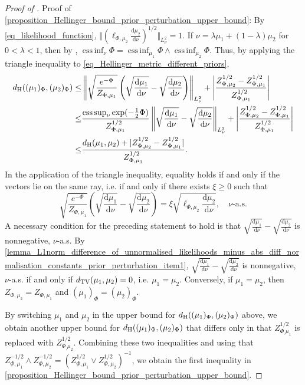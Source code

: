 \documentclass[a4paper]{scrartcl}
\theoremstyle{definition}
\numberwithin{equation}{section}
\newcommand{\rd}{\mathrm{d}}
\DeclareMathOperator*{\essinf}{ess\,inf}
\DeclareMathOperator*{\esssup}{ess\,sup}
\newcommand{\abs}[1]{\vert #1\vert}
\newcommand{\Abs}[1]{\left\vert#1\right\vert}
\newcommand{\norm}[1]{\Vert #1 \Vert}
\newcommand{\Norm}[1]{\left\Vert #1 \right\Vert}
\newcommand{\Hel}[0]{\textup{H}}
\newcommand{\TV}[0]{\textup{TV}}
\begin{document}
\begin{proof}[Proof of ]
Proof of \cref{proposition_Hellinger_bound_prior_perturbation_upper_bound}: By \eqref{eq_likelihood_function}, $\norm{ (\ell_{\Phi,\mu_2}\tfrac{\rd\mu_2}{\rd\nu})^{1/2}}_{L^2_\nu}=1$.
If $\nu=\lambda \mu_1+(1-\lambda)\mu_2$ for $0<\lambda<1$, then by , $\essinf_\nu \Phi=\essinf_{\mu_1}\Phi \wedge \essinf_{\mu_2}\Phi$.
Thus, by applying the triangle inequality to \eqref{eq_Hellinger_metric_different_priors}, 
\begin{align*}
 d_{\Hel}((\mu_1)_\Phi,(\mu_2)_\Phi)\leq & \Norm{\sqrt{\frac{e^{-\Phi}}{Z_{\Phi,\mu_1}}}\left(\sqrt{\frac{\rd\mu_1}{\rd\nu}}-\sqrt{\frac{\rd\mu_2}{\rd\nu}}\right)}_{L^2_\nu}+\Abs{\frac{Z_{\Phi,\mu_2}^{1/2}-Z_{\Phi,\mu_1}^{1/2}}{Z_{\Phi,\mu_1}^{1/2} }}
 \\
 \leq & \frac{\esssup_\nu \exp(-\tfrac{1}{2}\Phi)}{Z_{\Phi,\mu_1}^{1/2}}\Norm{\sqrt{\frac{\rd\mu_1}{\rd\nu}}-\sqrt{\frac{\rd\mu_2}{\rd\nu}}}_{L^2_\nu}+\Abs{\frac{Z_{\Phi,\mu_2}^{1/2}-Z_{\Phi,\mu_1}^{1/2}}{Z_{\Phi,\mu_1}^{1/2} }}
 \\
 \leq & \frac{d_{\Hel}(\mu_1,\mu_2)+\abs{Z_{\Phi,\mu_2}^{1/2}-Z_{\Phi,\mu_1}^{1/2}}}{Z_{\Phi,\mu_1}^{1/2}}.
\end{align*}
In the application of the triangle inequality, equality holds if and only if the vectors lie on the same ray, i.e. if and only if there exists $\xi\geq 0$ such that 
\begin{equation*}
 \sqrt{\frac{e^{-\Phi}}{Z_{\Phi,\mu_1}}}\left(\sqrt{\frac{\rd\mu_1}{\rd\nu}}-\sqrt{\frac{\rd\mu_2}{\rd\nu}}\right)=\xi \sqrt{\ell_{\Phi,\mu_2}\frac{\rd\mu_2}{\rd\nu}},\quad \text{$\nu$-a.s.}
\end{equation*}
A necessary condition for the preceding statement to hold is that $\sqrt{\tfrac{\rd\mu_1}{\rd\nu}}-\sqrt{\tfrac{\rd\mu_2}{\rd\nu}}$ is nonnegative, $\nu$-a.s.
By \ref{lemma_L1norm_difference_of_unnormalised_likelihoods_minus_abs_diff_normalisation_constants_prior_perturbation_item1}, $\sqrt{\tfrac{\rd\mu_1}{\rd\nu}}-\sqrt{\tfrac{\rd\mu_2}{\rd\nu}}$ is nonnegative, $\nu$-a.s. if and only if $d_{\TV}(\mu_1,\mu_2)=0$, i.e. $\mu_1=\mu_2$.
Conversely, if $\mu_1=\mu_2$, then $Z_{\Phi,\mu_2}=Z_{\Phi,\mu_1}$ and $(\mu_1)_\Phi=(\mu_2)_\Phi$.

By switching $\mu_1$ and $\mu_2$ in the upper bound for $d_{\Hel}((\mu_1)_\Phi,(\mu_2)_\Phi)$ above, we obtain another upper bound for $d_{\Hel}((\mu_1)_\Phi,(\mu_2)_\Phi)$ that differs only in that $Z_{\Phi_,\mu_1}^{1/2}$ is replaced with $Z_{\Phi_,\mu_2}^{1/2}$.
Combining these two inequalities and using that $Z_{\Phi,\mu_1}^{-1/2}\wedge Z_{\Phi,\mu_2}^{-1/2}=(Z_{\Phi,\mu_1}^{1/2}\vee Z_{\Phi,\mu_2}^{1/2})^{-1}$, we obtain the first inequality in \cref{proposition_Hellinger_bound_prior_perturbation_upper_bound}.


\end{proof}
\end{document}
